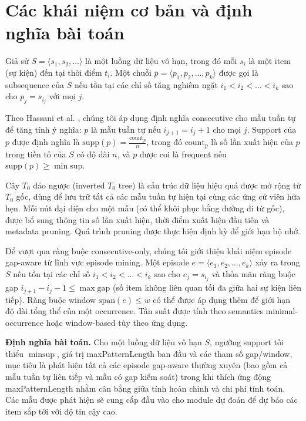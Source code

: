 \documentclass[conference]{IEEEtran}
\begin{document}
\section{Các khái niệm cơ bản và định nghĩa bài toán}
\label{sec:preliminaries}

Giả sử $S = \langle s_1, s_2, \dots \rangle$ là một luồng dữ liệu vô hạn, trong đó mỗi $s_i$ là một item (sự kiện) đến tại thời điểm $t_i$. Một chuỗi $p = \langle p_1, p_2, \dots, p_k \rangle$ được gọi là subsequence của $S$ nếu tồn tại các chỉ số tăng nghiêm ngặt $i_1 < i_2 < \dots < i_k$ sao cho $p_j = s_{i_j}$ với mọi $j$.

Theo Hassani et al. \cite{hassani2019}, chúng tôi áp dụng định nghĩa consecutive cho mẫu tuần tự để tăng tính ý nghĩa: $p$ là mẫu tuần tự nếu $i_{j+1} = i_j + 1$ cho mọi $j$. Support của $p$ được định nghĩa là $\text{supp}(p) = \frac{\text{count}_p}{n}$, trong đó $\text{count}_p$ là số lần xuất hiện của $p$ trong tiền tố của $S$ có độ dài $n$, và $p$ được coi là frequent nếu $\text{supp}(p) \geq \min\text{sup}$.

Cây $T_0$ đảo ngược (inverted $T_0$ tree) là cấu trúc dữ liệu hiệu quả được mở rộng từ $T_0$ gốc, dùng để lưu trữ tất cả các mẫu tuần tự hiện tại cùng các ứng cử viên hứa hẹn. Mỗi nút đại diện cho một mẫu (có thể khôi phục bằng đường đi từ gốc), được bổ sung thông tin số lần xuất hiện, thời điểm xuất hiện đầu tiên và metadata pruning. Quá trình pruning được thực hiện định kỳ để giới hạn bộ nhớ.

Để vượt qua ràng buộc consecutive-only, chúng tôi giới thiệu khái niệm episode gap-aware từ lĩnh vực episode mining. Một episode $e = \langle e_1, e_2, \dots, e_k \rangle$ xảy ra trong $S$ nếu tồn tại các chỉ số $i_1 < i_2 < \dots < i_k$ sao cho $e_j = s_{i_j}$ và thỏa mãn ràng buộc gap $i_{j+1} - i_j - 1 \leq \max\text{gap}$ (số item không liên quan tối đa giữa hai sự kiện liên tiếp). Ràng buộc window $\text{span}(e) \leq w$ có thể được áp dụng thêm để giới hạn độ dài tổng thể của một occurrence. Tần suất được tính theo semantics minimal-occurrence hoặc window-based tùy theo ứng dụng.

\textbf{Định nghĩa bài toán.} Cho một luồng dữ liệu vô hạn $S$, ngưỡng support tối thiểu $\min\text{sup}$, giá trị maxPatternLength ban đầu và các tham số gap/window, mục tiêu là phát hiện tất cả các episode gap-aware thường xuyên (bao gồm cả mẫu tuần tự liên tiếp và mẫu có gap kiểm soát) trong khi thích ứng động maxPatternLength nhằm cân bằng giữa tính hoàn chỉnh và chi phí tính toán. Các mẫu được phát hiện sẽ cung cấp đầu vào cho module dự đoán để dự báo các item sắp tới với độ tin cậy cao.
\end{document}
